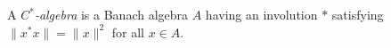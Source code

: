 A \emph{$C^*$-algebra} is a Banach algebra $A$ having an involution $\ast$ satisfying $\|x^*x\| = \|x\|^2$ for all $x \in A$.
